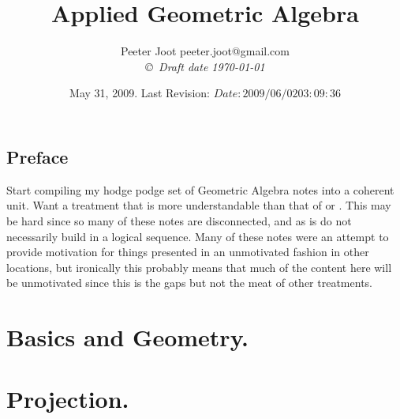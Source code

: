 \documentclass[12pt,leqno]{book}
\title{Applied Geometric Algebra}
\author{Peeter Joot  \quad peeter.joot@gmail.com \\
{\small\em \copyright \  Draft date \today }}
\date{ May 31, 2009.  Last Revision: $Date: 2009/06/02 03:09:36 $ }
\begin{document}
\maketitle
\tableofcontents
\listoffigures
\listoftables
\chapter*{Preface}\normalsize
\pagestyle{plain}

Start compiling my hodge podge set of Geometric Algebra notes into a coherent unit.  Want a treatment that is more
understandable than that of 
\cite{doran2003gap} or 
\cite{hestenes1999nfc}.
This may be hard since so many of these notes are disconnected, and as
is do not necessarily build in a logical sequence.  Many of these 
notes were an attempt to provide motivation for things presented in
an unmotivated fashion in other locations, but ironically this probably
means that much of the content here will be unmotivated since this 
is the gaps but not the meat of other treatments.

%

\pagestyle{headings}


\part{Basics and Geometry.}















\part{Projection.}






\end{document}
